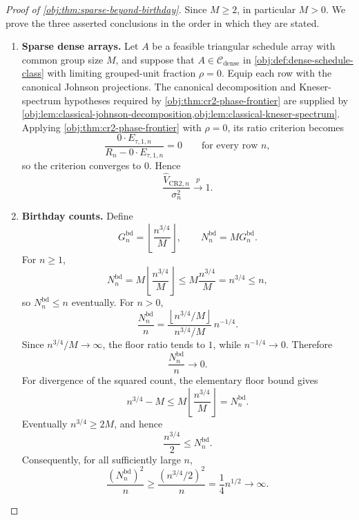 \documentclass[11pt]{article}
\begin{document}
\begin{proof}[Proof of \cref{obj:thm:sparse-beyond-birthday}]
Since \(M\ge 2\), in particular \(M>0\). We prove the three asserted conclusions in the order in which they are stated.
\begin{enumerate}
\item \textbf{Sparse dense arrays.}
Let \(A\) be a feasible triangular schedule array with common group size \(M\), and suppose that \(A\in\mathcal C_{\mathrm{dense}}\) in \cref{obj:def:dense-schedule-class} with limiting grouped-unit fraction \(\rho=0\). Equip each row with the canonical Johnson projections. The canonical decomposition and Kneser-spectrum hypotheses required by \cref{obj:thm:cr2-phase-frontier} are supplied by \cref{obj:lem:classical-johnson-decomposition,obj:lem:classical-kneser-spectrum}. Applying \cref{obj:thm:cr2-phase-frontier} with \(\rho=0\), its ratio criterion becomes
\[
\frac{0\cdot E_{\tau,1,n}}{R_n-0\cdot E_{\tau,1,n}}=0
\qquad\text{for every row }n,
\]
so the criterion converges to \(0\). Hence
\[
\frac{\widehat V_{\mathrm{CR2},n}}{\sigma_n^2}
\xrightarrow{p}1 .
\]

\item \textbf{Birthday counts.}
Define
\[
G_n^{\mathrm{bd}}
=
\left\lfloor \frac{n^{3/4}}{M}\right\rfloor,
\qquad
N_n^{\mathrm{bd}}=M G_n^{\mathrm{bd}} .
\]
For \(n\ge 1\),
\[
N_n^{\mathrm{bd}}
=
M\left\lfloor \frac{n^{3/4}}{M}\right\rfloor
\le
M\frac{n^{3/4}}{M}
=
n^{3/4}
\le n,
\]
so \(N_n^{\mathrm{bd}}\le n\) eventually. For \(n>0\),
\[
\frac{N_n^{\mathrm{bd}}}{n}
=
\frac{\left\lfloor n^{3/4}/M\right\rfloor}{n^{3/4}/M}\,
n^{-1/4}.
\]
Since \(n^{3/4}/M\to\infty\), the floor ratio tends to \(1\), while \(n^{-1/4}\to0\). Therefore
\[
\frac{N_n^{\mathrm{bd}}}{n}\to0.
\]
For divergence of the squared count, the elementary floor bound gives
\[
n^{3/4}-M
\le
M\left\lfloor \frac{n^{3/4}}{M}\right\rfloor
=
N_n^{\mathrm{bd}} .
\]
Eventually \(n^{3/4}\ge 2M\), and hence
\[
\frac{n^{3/4}}{2}\le N_n^{\mathrm{bd}}.
\]
Consequently, for all sufficiently large \(n\),
\[
\frac{(N_n^{\mathrm{bd}})^2}{n}
\ge
\frac{(n^{3/4}/2)^2}{n}
=
\frac14 n^{1/2}
\to\infty .
\]


\end{enumerate}
\end{proof}
\end{document}
